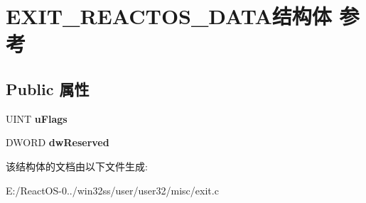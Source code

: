 \hypertarget{struct_e_x_i_t___r_e_a_c_t_o_s___d_a_t_a}{}\section{E\+X\+I\+T\+\_\+\+R\+E\+A\+C\+T\+O\+S\+\_\+\+D\+A\+T\+A结构体 参考}
\label{struct_e_x_i_t___r_e_a_c_t_o_s___d_a_t_a}
\subsection*{Public 属性}
\begin{DoxyCompactItemize}
\item 
\mbox{\label{struct_e_x_i_t___r_e_a_c_t_o_s___d_a_t_a_a8cd2a81f00d212ed61ce4d03518e6a80}} 
U\+I\+NT {\bfseries u\+Flags}
\item 
\mbox{\label{struct_e_x_i_t___r_e_a_c_t_o_s___d_a_t_a_a514b7c76e3f19d3134d7e6f767580a7c}} 
D\+W\+O\+RD {\bfseries dw\+Reserved}
\end{DoxyCompactItemize}


该结构体的文档由以下文件生成\+:\begin{DoxyCompactItemize}
\item 
E\+:/\+React\+O\+S-\/0../win32ss/user/user32/misc/exit.\+c\end{DoxyCompactItemize}
